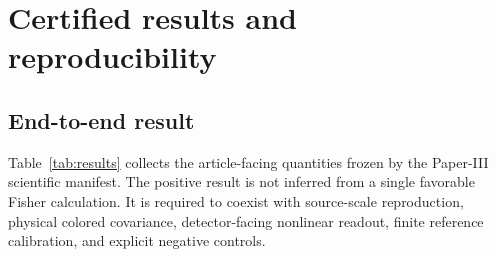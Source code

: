 \section{Certified results and reproducibility}
\label{sec:results}

\subsection{End-to-end result}

Table~\ref{tab:results} collects the article-facing quantities frozen by the Paper-III scientific manifest. The positive result is not inferred from a single favorable Fisher calculation. It is required to coexist with source-scale reproduction, physical colored covariance, detector-facing nonlinear readout, finite reference calibration, and explicit negative controls.

